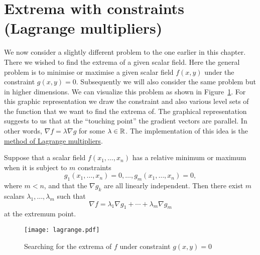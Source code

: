 \section{Extrema with constraints (Lagrange multipliers)}

We now consider a slightly different problem to the one earlier in this chapter.
There we wished to find the extrema of a given scalar field.
Here the general problem is to minimise or maximise a given scalar field \(f(x,y)\) under the constraint \(g(x,y) = 0\).
Subsequently we will also consider the same problem but in higher dimensions.
We can visualize this problem as shown in Figure~\ref{fig:lagrange}.
For this graphic representation we draw the constraint and also various level sets of the function that we want to find the extrema of.
The graphical representation suggests to us that at the ``touching point'' the gradient vectors are parallel.
In other words, \(\nabla f = \lambda \nabla g\) for some \(\lambda \in \mathbb{R}\).
The implementation of this idea is the \href{https://en.wikipedia.org/wiki/Lagrange_multiplier}{method of Lagrange multipliers}.


\begin{theorem}
    Suppose that a scalar field \(f(x_1,\ldots,x_n)\) has a relative minimum or maximum when it is subject to \(m\) constraints
    \[
        g_1(x_1,\ldots,x_n) = 0,
        \dots , g_m(x_1,\ldots,x_n)=0,
    \]
    where \(m<n\), and that the \(\nabla g_k\) are all linearly independent.
    Then there exist \(m\) scalars \(\lambda_1,\ldots,\lambda_m\) such that
    \[
        \nabla f = \lambda_1 \nabla g_1 + \cdots + \lambda_m \nabla g_m
    \]
    at the extremum point.
\end{theorem}

\begin{figure}[htb]
    \begin{center}
        \texttt{[image: lagrange.pdf]}
        \caption{Searching for the extrema of \(f\) under constraint \(g(x,y)=0\)}
        \label{fig:lagrange}
    \end{center}
\end{figure}


